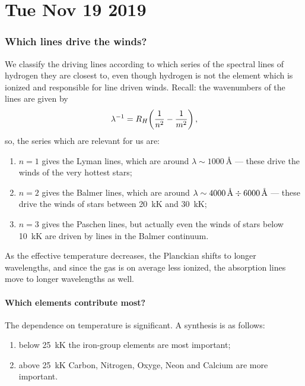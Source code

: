 \documentclass[main.tex]{subfiles}
\begin{document}
\section*{Tue Nov 19 2019}

\subsubsection{Which lines drive the winds?}

We classify the driving lines according to which series of the spectral lines of hydrogen they are closest to, even though hydrogen is not the element which is ionized and responsible for line driven winds.
Recall: the wavenumbers of the lines are given by 
%
\begin{align}
\lambda^{-1} = R_H \qty(\frac{1}{n^2}- \frac{1}{m^2})
\,,
\end{align}
%
so, the series which are relevant for us are:
\begin{enumerate}
  \item \(n=1\) gives the Lyman lines, which are around \(\lambda \sim \SI{1000}{\angstrom}\) --- these drive the winds of the very hottest stars;
  \item \(n=2\) gives the Balmer lines, which are around \(\lambda \sim \SI{4000}{\angstrom} \divisionsymbol \SI{6000}{\angstrom}\) --- these drive the winds of stars between \SI{20}{\kilo\kelvin} and \SI{30}{\kilo\kelvin};
  \item \(n=3\) gives the Paschen lines, but actually even the winds of stars below \SI{10}{\kilo\kelvin} are driven by lines in the Balmer continuum.
\end{enumerate}

As the effective temperature decreases, the Planckian shifts to longer wavelengths, and since the gas is on average less ionized, the absorption lines move to longer wavelengths as well.

\paragraph{Which elements contribute most?}

The dependence on temperature is significant. A synthesis is as follows: 
\begin{enumerate}
  \item below \SI{25}{\kilo\kelvin} the iron-group elements are most important;
  \item above \SI{25}{\kilo\kelvin} Carbon, Nitrogen, Oxyge, Neon and Calcium are more important.
\end{enumerate}
\end{document}
